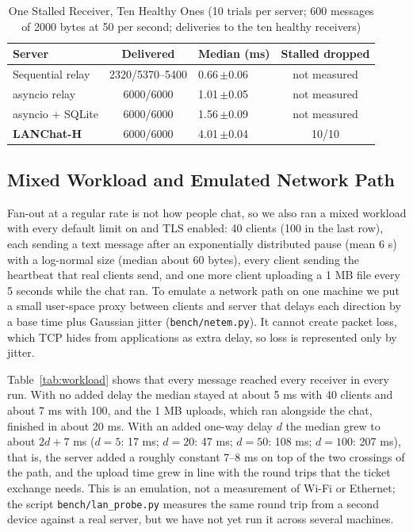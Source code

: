 \documentclass[conference]{IEEEtran}
\newcommand{\code}[1]{\texttt{#1}}
\begin{document}
\begin{table}[t]
\centering
\caption{One Stalled Receiver, Ten Healthy Ones (10 trials per server; 600 messages of 2000 bytes at 50 per second; deliveries to the ten healthy receivers)}
\label{tab:hol}
\footnotesize
\begin{tabularx}{\columnwidth}{@{}l c Y c@{}}
\toprule
\textbf{Server} & \textbf{Delivered} & \textbf{Median (ms)} & \textbf{Stalled dropped} \\
\midrule
Sequential relay & 2320/5370--5400 & 0.66{\,\scriptsize$\pm$0.06} & not measured \\
asyncio relay & 6000/6000 & 1.01{\,\scriptsize$\pm$0.05} & not measured \\
asyncio + SQLite & 6000/6000 & 1.56{\,\scriptsize$\pm$0.09} & not measured \\
\textbf{LANChat-H} & 6000/6000 & 4.01{\,\scriptsize$\pm$0.04} & 10/10 \\
\bottomrule
\end{tabularx}
\end{table}

\subsection{Mixed Workload and Emulated Network Path}\label{sec:eval-workload}
Fan-out at a regular rate is not how people chat, so we also ran a mixed workload with every default limit on and TLS enabled: 40 clients (100 in the last row), each sending a text message after an exponentially distributed pause (mean 6 s) with a log-normal size (median about 60 bytes), every client sending the heartbeat that real clients send, and one more client uploading a 1 MB file every 5 seconds while the chat ran. To emulate a network path on one machine we put a small user-space proxy between clients and server that delays each direction by a base time plus Gaussian jitter (\code{bench/netem.py}). It cannot create packet loss, which TCP hides from applications as extra delay, so loss is represented only by jitter.

Table~\ref{tab:workload} shows that every message reached every receiver in every run. With no added delay the median stayed at about 5 ms with 40 clients and about 7 ms with 100, and the 1 MB uploads, which ran alongside the chat, finished in about 20 ms. With an added one-way delay $d$ the median grew to about $2d + 7$ ms ($d{=}5$: 17 ms; $d{=}20$: 47 ms; $d{=}50$: 108 ms; $d{=}100$: 207 ms), that is, the server added a roughly constant 7--8 ms on top of the two crossings of the path, and the upload time grew in line with the round trips that the ticket exchange needs. This is an emulation, not a measurement of Wi-Fi or Ethernet; the script \code{bench/lan\_probe.py} measures the same round trip from a second device against a real server, but we have not yet run it across several machines.
\end{document}
